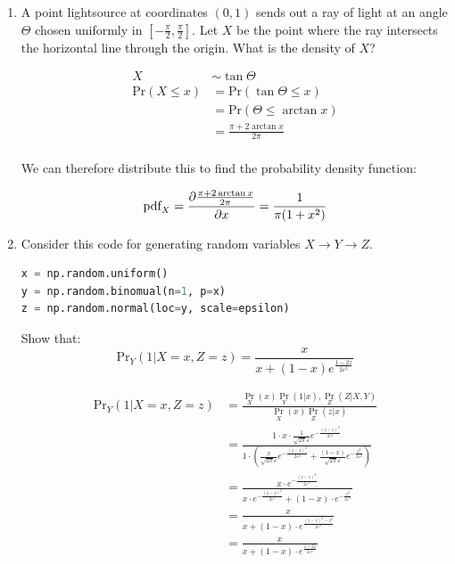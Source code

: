\documentclass[10pt,\jkfside,a4paper]{article}
\begin{document}
\begin{enumerate}
\begin{enumerate}[label=(\alph*)]
\end{enumerate}

\item A point lightsource at coordinates $(0, 1)$ sends out a ray of light
at an angle $\Theta$ chosen uniformly in $[-\frac{\pi}{2}, \frac{\pi}{2}]$.
Let $X$ be the point where the ray intersects the horizontal line through
the origin. What is the density of $X$?

\[
\begin{split}
X &\sim \tan\Theta \\
\text{Pr}(X \leq x) &= \text{Pr}\left( \tan \Theta \leq x \right) \\
&= \text{Pr}\left( \Theta \leq \arctan x \right) \\
&= \frac{\pi + 2\arctan x}{2\pi} \\
\end{split}
\]

We can therefore distribute this to find the probability density function:

\[
\text{pdf}_X = \pdv{\frac{\pi + 2\arctan x}{2\pi}}{x} = \frac{1}{\pi(1 + x^2)}
\]

\fi

\item Consider this code for generating random variables $X \rightarrow Y
\rightarrow Z$.

\begin{lstlisting}[language=Python]
x = np.random.uniform()
y = np.random.binomual(n=1, p=x)
z = np.random.normal(loc=y, scale=epsilon)
\end{lstlisting}

Show that:
\[
\text{Pr}_Y\left( 1 | X = x, Z = z \right) = \frac{x}{x + (1 - x)e^{\frac{1-2z}{2\varepsilon^2}}}
\]

\[
\begin{split}
\text{Pr}_Y\left( 1 | X = x, Z = z \right)
&= \frac{\Pr_X(x)\Pr_Y(1 | x), \Pr_Z(Z | X, Y)}{\Pr_X(x)\Pr_Z(z | x)} \\
&= \frac{1 \cdot x \cdot \frac{1}{\sqrt{2\pi}\varepsilon} e^{-\frac{\left( z
- 1 \right)^2}{2\varepsilon^2}} }{1\cdot\left(\frac{x}{\sqrt{2\pi}\varepsilon}
e^{-\frac{\left( z - 1 \right)^2}{2\varepsilon^2}} + \frac{
(1 - x)}{\sqrt{2\pi}\varepsilon}e^{-\frac{z^2}{2\varepsilon^2}}\right)} \\
&= \frac{x\cdot e^{-\frac{\left( z - 1 \right)^2} {2\varepsilon^2}}}{x \cdot
 e^{-\frac{\left( z - 1 \right)^2}{2\varepsilon^2}} + (1 - x) \cdot
 e^{-\frac{z^2}{2\varepsilon^2}}} \\
&= \frac{x}{x + (1 - x) \cdot e^{\frac{(z - 1)^2 - z^2 }{2\varepsilon^2}}} \\
&= \frac{x}{x + (1 - x) \cdot e^{\frac{1 - 2z}{2\varepsilon^2}}} \\
\end{split}
\]



\end{enumerate}
\end{document}
